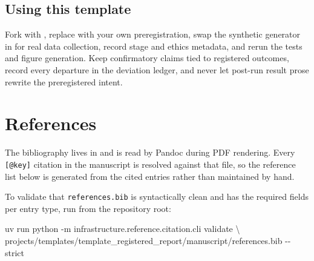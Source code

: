 \documentclass[
]{article}
\newenvironment{Shaded}{}{}
\newcommand{\AttributeTok}[1]{\textcolor[rgb]{0.49,0.56,0.16}{#1}}
\newcommand{\DataTypeTok}[1]{\textcolor[rgb]{0.56,0.13,0.00}{#1}}
\newcommand{\ExtensionTok}[1]{#1}
\newcommand{\NormalTok}[1]{#1}
\begin{document}
\subsection{Using this template}\label{using-this-template}

Fork with , replace
 with your own preregistration,
swap the synthetic generator in
 for real data collection,
record stage and ethics metadata, and rerun the tests and figure
generation. Keep confirmatory claims tied to registered outcomes, record
every departure in the deviation ledger, and never let post-run result
prose rewrite the preregistered intent.

\newpage

\section{References}\label{sec:references}

The bibliography lives in
\href{references.bib}{} and is read by
Pandoc during PDF rendering. Every \texttt{{[}@key{]}} citation in the
manuscript is resolved against that file, so the reference list below is
generated from the cited entries rather than maintained by hand.

To validate that \texttt{references.bib} is syntactically clean and has
the required fields per entry type, run from the repository root:

\begin{Shaded}
\begin{Highlighting}[]
\ExtensionTok{uv}\NormalTok{ run python }\AttributeTok{{-}m}\NormalTok{ infrastructure.reference.citation.cli validate }\DataTypeTok{\textbackslash{}}
\NormalTok{    projects/templates/template\_registered\_report/manuscript/references.bib }\AttributeTok{{-}{-}strict}
\end{Highlighting}
\end{Shaded}




\clearpage


\end{document}
